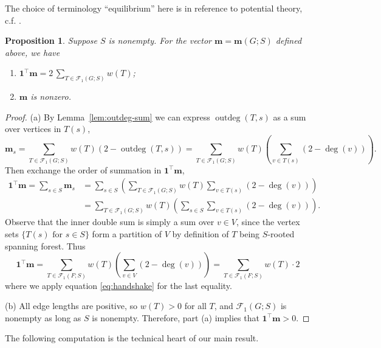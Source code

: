 \documentclass[12pt]{amsart}
\newtheorem{prop}[thm]{Proposition}
\newtheorem{cor}[thm]{Corollary}
\theoremstyle{definition}
\newcommand{\bone}{\mathbf{1}}
\newcommand{\boldm}{\mathbf{m}}
\newcommand{\tr}{\intercal}
\newcommand{\trees}{\mathcal{F}_1}
\DeclareMathOperator{\outdeg}{outdeg}
\begin{document}
The choice of terminology ``equilibrium'' here is in reference to potential theory, c.f. \cite{Tsu}\cite{steinerberger}.

\begin{prop}
\label{prop:m-sum}
Suppose $S$ is nonempty.
For the vector $\boldm = \boldm(G; S)$ defined above, we have
\begin{enumerate}[label=(\alph*)]
\item
$\displaystyle \bone^\tr \boldm = 2 \,\sum_{T \in \trees(G;S)} w({T})$;

\item 
$\boldm$ is nonzero.
\end{enumerate}
\end{prop}
\begin{proof}
(a)
By Lemma~\ref{lem:outdeg-sum} we can express $\outdeg(T, s)$ as a sum over vertices in $T(s)$,
\[
	\boldm_s = \sum_{T \in \trees(G;S)} w({T}) (2 - \outdeg (T,s))
= \sum_{T \in \trees(G;S)} w({T}) \left( \sum_{v \in T(s)}(2 - \deg(v))\right).
\]
Then exchange the order of summation in $\bone^\tr \boldm$,
\begin{align}
	\bone^\tr \boldm = \sum_{s\in S} \boldm_s &= \sum_{s \in S} \left( \sum_{T \in \trees(G;S)} w({T}) \sum_{v \in T(s)}(2 - \deg(v)) \right) \\
	&= \sum_{T \in \trees(G;S)} w({T}) \left( \sum_{s\in S} \sum_{v \in T(s)} (2 - \deg(v)) \right) .
\end{align}
Observe that the inner double sum is simply a sum over $v \in V$,
since the vertex sets $\{T(s) \text{ for } s \in S\}$ form a partition of $V$ by definition of $T$ being $S$-rooted spanning forest.
Thus 
\[
	\bone^\tr \boldm = \sum_{T \in \trees(F;S)} w({T}) \left( \sum_{v \in V} (2 - \deg(v))\right)
	= \sum_{T \in \trees(F;S)} w({T}) \cdot 2 
\]
where we apply equation \eqref{eq:handshake} for the last equality.

(b) 
All edge lengths are positive, so $w({T}) > 0$ for all $T$, and $\trees(G; S)$ is nonempty as long as $S$ is nonempty. 
Therefore, part (a) implies that $\bone^\tr \boldm > 0$.
\end{proof}


The following computation is the technical heart of our main result.
\end{document}
